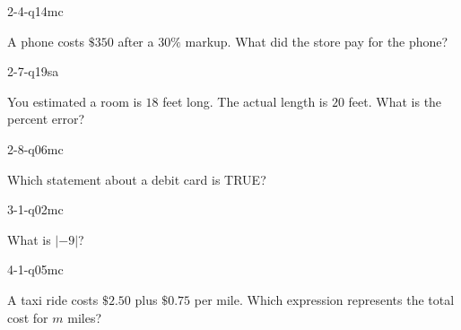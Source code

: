 \begin{practiceQuestion}{2-4-q14}{mc}
\begin{questionText}
A phone costs $\$350$ after a $30\%$ markup. What did the store pay for the phone?
\end{questionText}
\end{practiceQuestion}

\begin{practiceQuestion}{2-7-q19}{sa}
\begin{questionText}
You estimated a room is $18$ feet long. The actual length is $20$ feet. What is the percent error?
\end{questionText}
\end{practiceQuestion}

\begin{practiceQuestion}{2-8-q06}{mc}
\begin{questionText}
Which statement about a debit card is TRUE?
\end{questionText}
\end{practiceQuestion}

\begin{practiceQuestion}{3-1-q02}{mc}
\begin{questionText}
What is $|-9|$?
\end{questionText}
\end{practiceQuestion}

\begin{practiceQuestion}{4-1-q05}{mc}
\begin{questionText}
A taxi ride costs $\$2.50$ plus $\$0.75$ per mile. Which expression represents the total cost for $m$ miles?
\end{questionText}
\end{practiceQuestion}

